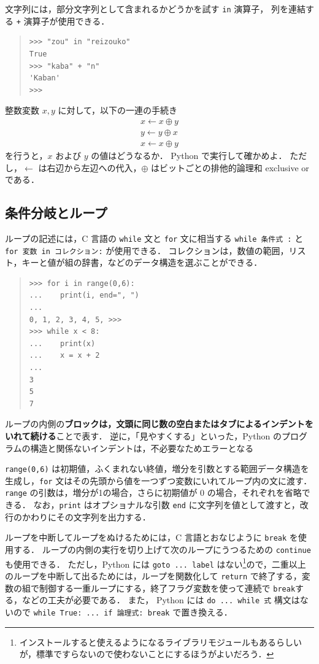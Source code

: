 \documentclass[11pt,a4,epsf]{report}
\begin{document}
文字列には，部分文字列として含まれるかどうかを試す \verb+in+ 演算子，
列を連結する \verb-+- 演算子が使用できる．
\begin{quote}
\small
\begin{verbatim}
>>> "zou" in "reizouko"
True
>>> "kaba" + "n"
'Kaban'
>>>
\end{verbatim}
\end{quote}

\begin{excercise}
整数変数 $x, y$ に対して，以下の一連の手続き
\begin{eqnarray*}
x \leftarrow x \oplus y \\
y \leftarrow y \oplus x \\
x \leftarrow x \oplus y
\end{eqnarray*}
を行うと，$x$ および $y$ の値はどうなるか．
Python で実行して確かめよ．
ただし，$\leftarrow$ は右辺から左辺への代入，$\oplus$ はビットごとの排他的論理和 exclusive or である\cite{Warren-book-2012}．
\end{excercise}

\subsection{条件分岐とループ}

ループの記述には，C 言語の \verb+while+ 文と \verb+for+ 文に相当する \verb+while 条件式 :+ と \verb+for 変数 in コレクション:+ が使用できる．
コレクションは，数値の範囲，リスト，キーと値が組の辞書，などのデータ構造を選ぶことができる．
\begin{quote}
\small
\begin{verbatim}
>>> for i in range(0,6):
...    print(i, end=", ")
...
0, 1, 2, 3, 4, 5, >>>
>>> while x < 8:
...    print(x)
...    x = x + 2
...
3
5
7
\end{verbatim}
\end{quote}
ループの内側の{\bf ブロックは，文頭に同じ数の空白またはタブによるインデントをいれて続ける}ことで表す．
逆に，「見やすくする」といった，Python のプログラムの構造と関係ないインデントは，不必要なためエラーとなる

\verb+range(0,6)+ は初期値，ふくまれない終値，増分を引数とする範囲データ構造を生成し，\verb+for+ 文はその先頭から値を一つずつ変数にいれてループ内の文に渡す．
\verb+range+ の引数は，増分が1の場合，さらに初期値が 0 の場合，それぞれを省略できる．
なお，\verb+print+ はオプショナルな引数 \verb+end+ に文字列を値として渡すと，改行のかわりにその文字列を出力する．

ループを中断してループをぬけるためには，C 言語とおなじように \verb+break+ を使用する．
ループの内側の実行を切り上げて次のループにうつるための \verb+continue+ も使用できる．
ただし，Python には \verb+goto ... label+ はない\footnote{インストールすると使えるようになるライブラリモジュールもあるらしいが，標準ですらないので使わないことにするほうがよいだろう．}ので，二重以上のループを中断して出るためには，ループを関数化して \verb+return+ で終了する，変数の組で制御する一重ループにする，終了フラグ変数を使って連続で \verb+break+する，などの工夫が必要である．
また， Python には \verb+do ... while 式+ 構文はないので \verb+while True: ... if 論理式: break+ で置き換える．
\end{document}
